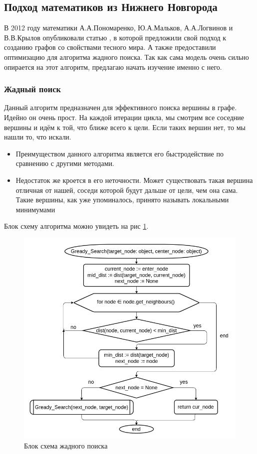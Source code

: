 \subsection{Подход математиков из Нижнего Новгорода}

В 2012 году математики А.А.Пономаренко, Ю.А.Мальков, А.А.Логвинов и В.В.Крылов
опубликовали статью \cite{Ponomarenko} , в которой предложили свой подход к созданию графов со свойствами 
тесного мира. А также предоставили оптимизацию для алгоритма жадного поиска. Так как сама модель
очень сильно опирается на этот алгоритм, предлагаю начать изучение именно с него.

\subsubsection{Жадный поиск}
Данный алгоритм предназначен для эффективного поиска вершины в графе. Идейно он очень прост.
На каждой итерации цикла, мы смотрим все соседние вершины и идём к той, что ближе всего к цели.
Если таких вершин нет, то мы нашли то, что искали.

\begin{itemize}
    \item Преимуществом данного алгоритма является его быстродействие по сравнению с другими методами. 
    \item Недостаток же кроется в его неточности. Может существовать такая вершина отличная
    от нашей, соседи которой будут дальше от цели, чем она сама. Такие вершины, как уже упоминалось,
    принято называть локальными минимумами 
\end{itemize}

Блок схему алгоритма можно увидеть на рис \ref{grady_search_block_scheme}. 

\begin{figure}[H]
    \centering
    \includegraphics[scale=0.6]{./pictures/Gready_Search.png}
    \caption{Блок схема жадного поиска} \label{grady_search_block_scheme}
\end{figure}

